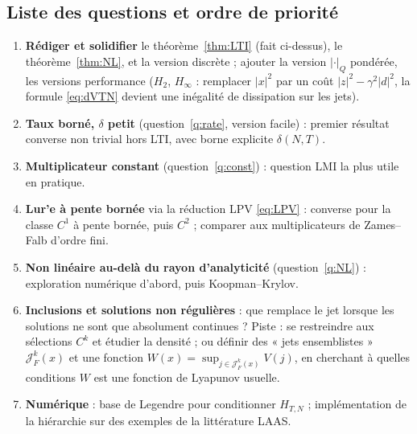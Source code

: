 \documentclass[11pt,a4paper]{article}
\theoremstyle{definition}
\theoremstyle{remark}
\newcommand{\Jet}{\mathcal{J}}
\begin{document}
\subsection{Liste des questions et ordre de priorité}
\begin{enumerate}[nosep]
\item \textbf{Rédiger et solidifier} le théorème~\ref{thm:LTI} (fait ci-dessus), le théorème~\ref{thm:NL}, et la version discrète ; ajouter la version $|\cdot|_Q$ pondérée, les versions performance ($H_2$, $H_\infty$ : remplacer $|x|^2$ par un coût $|z|^2-\gamma^2|d|^2$, la formule \eqref{eq:dVTN} devient une inégalité de dissipation sur les jets).
\item \textbf{Taux borné, $\delta$ petit} (question~\ref{q:rate}, version facile) : premier résultat converse non trivial hors LTI, avec borne explicite $\delta(N,T)$.
\item \textbf{Multiplicateur constant} (question~\ref{q:const}) : question LMI la plus utile en pratique.
\item \textbf{Lur'e à pente bornée} via la réduction LPV \eqref{eq:LPV} : converse pour la classe $C^1$ à pente bornée, puis $C^2$ ; comparer aux multiplicateurs de Zames–Falb d'ordre fini.
\item \textbf{Non linéaire au-delà du rayon d'analyticité} (question~\ref{q:NL}) : exploration numérique d'abord, puis Koopman–Krylov.
\item \textbf{Inclusions et solutions non régulières} : que remplace le jet lorsque les solutions ne sont que absolument continues ? Piste : se restreindre aux sélections $C^k$ et étudier la densité ; ou définir des « jets ensemblistes » $\Jet^k_F(x)$ et une fonction $W(x) = \sup_{j\in\Jet^k_F(x)}V(j)$, en cherchant à quelles conditions $W$ est une fonction de Lyapunov usuelle.
\item \textbf{Numérique} : base de Legendre pour conditionner $H_{T,N}$ ; implémentation de la hiérarchie sur des exemples de la littérature LAAS.
\end{enumerate}
\end{document}
